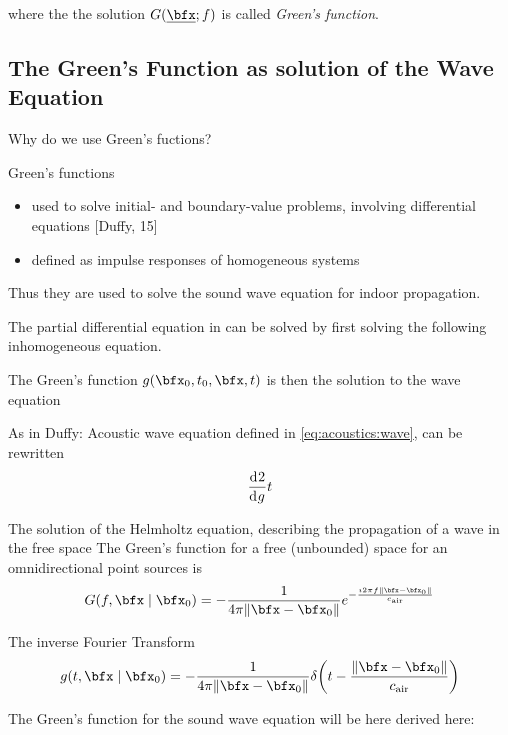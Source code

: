where the the solution $G(\positionMicrophone ; f)$ is called \textit{Green's function}.

\subsection{The Green's Function as solution of the Wave Equation}

Why do we use Green's fuctions?

Green's functions
\begin{itemize}
    \item used to solve initial- and boundary-value problems, involving differential equations [Duffy, 15]
    \item defined as impulse responses of homogeneous systems
\end{itemize}
Thus they are used to solve the sound wave equation for indoor propagation.

The partial differential equation in can be solved by first solving the following inhomogeneous equation.

The Green's function $g({\bfx}_0, t_0, \bfx, t)$ is then the solution to the wave equation

As in Duffy: Acoustic wave equation defined in \cref{eq:acoustics:wave}, can be rewritten
\begin{equation}
    \kderiv{2}{g}{t}
\end{equation}

The solution of the Helmholtz equation, describing the propagation of a wave in the free space
The Green's function for a free (unbounded) space for an omnidirectional point sources is
\begin{equation}
    G(f, \bfx \mid {\bfx}_0) = - \frac{1}{4 \pi \norm{\bfx - {\bfx}_0}} e^{- \frac{\Ii  2 \pi f \norm{\bfx - {\bfx}_0}}{\cair}}
\end{equation}

The inverse Fourier Transform
\begin{equation}
    g(t, \bfx \mid {\bfx}_0) = - \frac{1}{4 \pi \norm{\bfx - {\bfx}_0}} \delta \kparen{t - \frac{\norm{\bfx -{\bfx}_0}}{\cair}}
\end{equation}

The Green's function for the sound wave equation will be here derived here:

